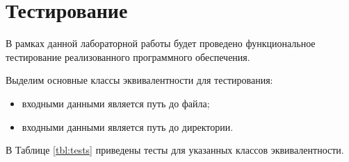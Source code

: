 
\clearpage





\clearpage

\section{Тестирование}

В рамках данной лабораторной работы будет проведено функциональное тестирование реализованного программного обеспечения.

Выделим основные классы эквивалентности для тестирования:
\begin{itemize}
    \item входными данными является путь до файла;
    \item входными данными является путь до директории.
\end{itemize}

В Таблице \ref{tbl:tests} приведены тесты для указанных классов эквивалентности.

